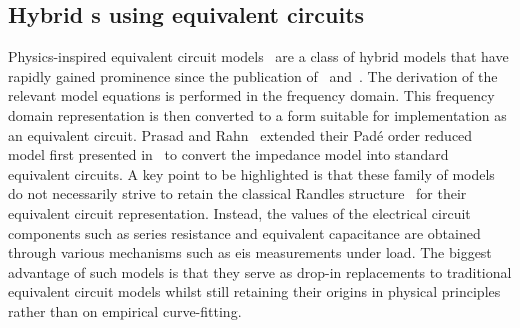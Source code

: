\subsection{Hybrid s using equivalent circuits}

Physics-inspired                        equivalent                       circuit
models~\cite{Prasad2012,Prasad2014,Zhang2017,Cheng2017,Merla2018} are a class of
hybrid  models  that  have  rapidly  gained  prominence  since  the  publication
of~\cite{Jokar2016}  and~\cite{Fan2015}. The  derivation of  the relevant  model
equations  is  performed   in  the  frequency  domain.   This  frequency  domain
representation is  then converted to  a form  suitable for implementation  as an
equivalent circuit. Prasad and Rahn~\cite{Prasad2014} extended their Padé order
reduced  model first  presented  in~\cite{Prasad2013} to  convert the  impedance
model into standard  equivalent circuits. A key point to  be highlighted is that
these family of models do not necessarily strive to retain the classical Randles
structure~\cite{Randles1947}  for   their  equivalent   circuit  representation.
Instead,  the  values  of  the  electrical circuit  components  such  as  series
resistance and  equivalent capacitance  are obtained through  various mechanisms
such as \gls{eis} measurements under load.  The biggest advantage of such models
is that  they serve  as drop-in replacements  to traditional  equivalent circuit
models whilst still  retaining their origins in physical  principles rather than
on empirical curve-fitting.







